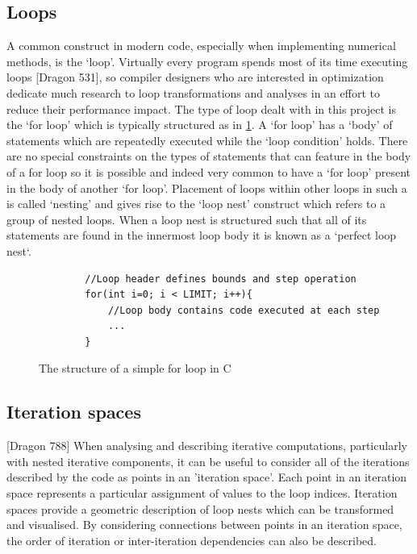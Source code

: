 \documentclass[a4paper,12pt,twoside]{report}
\begin{document}
\subsection*{Loops}
A common construct in modern code, especially when implementing numerical methods, is the `loop'. Virtually every program spends most of its 
time executing loops [Dragon 531], so compiler designers who are interested in optimization dedicate much research to 
loop transformations and analyses in an effort to reduce their performance impact. The type of loop dealt with in this project is the
`for loop' which is typically structured as in \ref{fig:forloop}. A `for loop' has a `body' of statements which are repeatedly executed
while the `loop condition' holds. There are no special constraints on the types of statements that can feature in the body of a for loop so it
is possible and indeed very common to have a `for loop' present in the body of another `for loop'. Placement of loops within other loops in such a 
is called `nesting' and gives rise to the `loop nest' construct which refers to a group of nested loops. When a loop nest is structured
such that all of its statements are found in the innermost loop body it is known as a `perfect loop nest`.

\begin{figure}[h]
    \begin{lstlisting}
        //Loop header defines bounds and step operation
        for(int i=0; i < LIMIT; i++){
            //Loop body contains code executed at each step
            ...
        }
    \end{lstlisting}
    \caption{The structure of a simple for loop in C}
    \label{fig:forloop}
\end{figure}

\subsection*{Iteration spaces}
[Dragon 788]
When analysing and describing iterative computations, particularly with nested iterative components, it can be useful to consider 
all of the iterations described by the code as points in an 'iteration space'. Each point in an iteration space represents a
particular assignment of values to the loop indices. Iteration spaces provide a geometric description of loop nests which can be
transformed and visualised. By considering connections between points in an iteration space, the order of iteration or 
inter-iteration dependencies can also be described.
\end{document}
